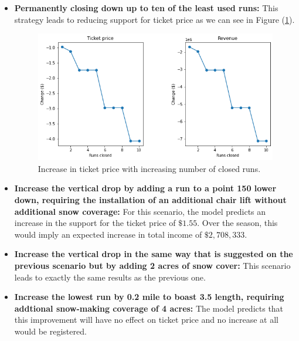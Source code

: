 \documentclass[twocolumn, 12pt]{article}
\begin{document}
\begin{itemize}
	\item \textbf{Permanently closing down up to ten of the least used runs:} This strategy leads to reducing support for ticket price as we can see in Figure (\ref{scenario1}).
	
	\begin{figure}[h!]
		\includegraphics[width=\linewidth]{scenario1.png}
		\caption{Increase in ticket price with increasing number of closed runs.} 
		\label{scenario1}
	\end{figure}
	
	\item \textbf{Increase the vertical drop by adding a run to a point 150 lower down, requiring the installation of an additional chair lift without additional snow coverage:} For this scenario, the model predicts an increase in the support for the ticket price of $ \$1.55 $. Over the season, this would imply an expected increase in total income of $ \$2,708,333$.
	
	\item \textbf{Increase the vertical drop in the same way that is suggested on the previous scenario but by adding 2 acres of snow cover:} This scenario leads to exactly the same results as the previous one.
	
	\item \textbf{Increase the lowest run by 0.2 mile to boast 3.5 length, requiring addtional snow-making coverage of 4 acres:} The model predicts that this improvement will have no effect on ticket price and no increase at all would be registered. 
\end{itemize}
\end{document}
